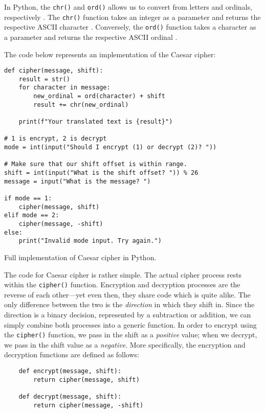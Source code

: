 In Python, the \texttt{chr()} and \texttt{ord()} allows us to convert from letters and ordinals, respectively \cite{caesar_cipher_invent_with_python}. 
The \texttt{chr()} function takes an integer as a parameter and returns the respective ASCII character \cite{caesar_cipher_invent_with_python}. Conversely, 
the \texttt{ord()} function takes a character as a parameter and returns the respective ASCII ordinal \cite{caesar_cipher_invent_with_python}. 

The code below represents an implementation of the Caesar cipher:

\begin{listing}[H]
    \begin{verbatim}
def cipher(message, shift):
    result = str()
    for character in message:
        new_ordinal = ord(character) + shift
        result += chr(new_ordinal)
        
    print(f"Your translated text is {result}")
    
# 1 is encrypt, 2 is decrypt
mode = int(input("Should I encrypt (1) or decrypt (2)? "))
    
# Make sure that our shift offset is within range.
shift = int(input("What is the shift offset? ")) % 26
message = input("What is the message? ")
    
if mode == 1:
    cipher(message, shift)
elif mode == 2:
    cipher(message, -shift)
else:
    print("Invalid mode input. Try again.")    
    \end{verbatim}
    \caption{Full implementation of Caesar cipher in Python.}
\end{listing}

The code for Caesar cipher is rather simple. The actual cipher process rests within the \texttt{cipher()} function.
Encryption and decryption processes are the reverse of each other---yet even then, they share code which is quite alike.
The only difference between the two is the \textit{direction} in which they shift in. Since the direction is a binary decision, 
represented by a subtraction or addition, we can simply combine both processes into a generic function. In order to encrypt
using the \texttt{cipher()} function, we pass in the shift as a \textit{positive} value; when we decrypt, we pass in the shift
value as a \textit{negative}. More specifically, the encryption and decryption functions are defined as follows:

\begin{listing}[H]
    \begin{verbatim}
    def encrypt(message, shift):
        return cipher(message, shift)
    
    def decrypt(message, shift):
        return cipher(message, -shift)
    \end{verbatim}
\end{listing}


